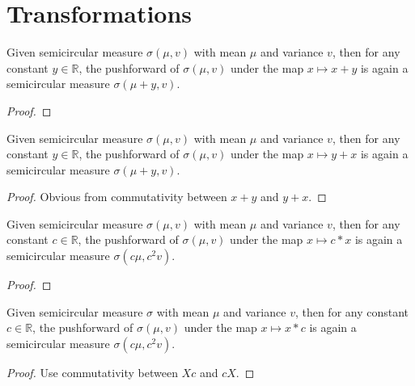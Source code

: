 


\section{Transformations}


\begin{lemma}
  \label{lem:semicircleReal_map_add_const}
  \notready
  Given semicircular measure $\sigma(\mu, v)$ with mean $\mu$ and variance $v$, then for any constant $y \in \mathbb{R}$, the pushforward
  of $\sigma(\mu, v)$ under the map $x \mapsto x + y$ is again a semicircular measure $\sigma(\mu + y, v)$. 
  \begin{proof}
  \end{proof}
\end{lemma}


\begin{lemma}
  \label{lem:semicircleReal_map_const_add}
  \mathlibok
  Given semicircular measure $\sigma(\mu, v)$ with mean $\mu$ and variance $v$, then for any constant $y \in \mathbb{R}$, the pushforward
  of $\sigma(\mu, v)$ under the map $x \mapsto y + x$ is again a semicircular measure $\sigma(\mu + y, v)$. 
  \begin{proof}
    Obvious from commutativity between $x + y$ and $y + x$.
  \end{proof}
\end{lemma}


\begin{lemma}
  \label{lem:semicircleReal_map_const_mul}
  \notready
    Given semicircular measure $\sigma(\mu, v)$ with mean $\mu$ and variance $v$, then for any constant $c \in \mathbb{R}$, the pushforward
  of $\sigma(\mu, v)$ under the map $x \mapsto c * x$ is again a semicircular measure $\sigma(c\mu, c^2v)$. 
  \begin{proof}
  \end{proof}
\end{lemma}



\begin{lemma}
  \label{lem:semicircleReal_map_mul_const}
  \mathlibok
   Given semicircular measure $\sigma$ with mean $\mu$ and variance $v$, then for any constant $c \in \mathbb{R}$, the pushforward
  of $\sigma(\mu, v)$ under the map $x \mapsto x * c$ is again a semicircular measure $\sigma(c\mu, c^2v)$. 
  \begin{proof}
    Use commutativity between $Xc$ and $cX$.
  \end{proof}
\end{lemma}



